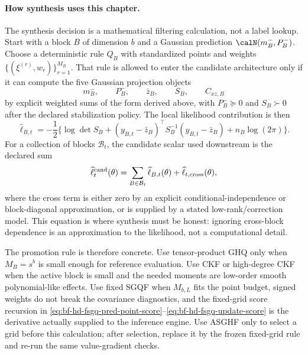 \paragraph{How synthesis uses this chapter.}
The synthesis decision is a mathematical filtering calculation, not a label
lookup.  Start with a block \(B\) of dimension \(b\) and a Gaussian prediction
\(\calN(m_B^-,P_B^-)\).  Choose a deterministic rule \(Q_B\) with standardized
points and weights \(\{(\xi^{(r)},w_r)\}_{r=1}^{M_B}\).  That rule is allowed
to enter the candidate architecture only if it can compute the five Gaussian
projection objects
\[
  m_B^-,\qquad
  P_B^-,\qquad
  \bar z_B,\qquad
  S_B,\qquad
  C_{xz,B}
\]
by explicit weighted sums of the form derived above, with \(P_B^-\succeq0\)
and \(S_B\succ0\) after the declared stabilization policy.  The local
likelihood contribution is then
\[
  \widehat\ell_{B,t}
  =
  -\frac12\{\log\det S_B
  +(y_{B,t}-\bar z_B)^\top S_B^{-1}(y_{B,t}-\bar z_B)
  +n_B\log(2\pi)\}.
\]
For a collection of blocks \(\mathcal B_t\), the candidate scalar used
downstream is the declared sum
\[
  \widehat\ell_t^{\rm cand}(\theta)
  =
  \sum_{B\in\mathcal B_t}\widehat\ell_{B,t}(\theta)
  +\widehat\ell_{t,\rm cross}(\theta),
\]
where the cross term is either zero by an explicit conditional-independence or
block-diagonal approximation, or is supplied by a stated low-rank/correction
model.  This equation is where synthesis must be honest: ignoring cross-block
dependence is an approximation to the likelihood, not a computational detail.

The promotion rule is therefore concrete.  Use tensor-product GHQ only when
\(M_B=s^b\) is small enough for reference evaluation.  Use CKF or high-degree
CKF when the active block is small and the needed moments are low-order smooth
polynomial-like effects.  Use fixed SGQF when \(M_{b,L}\) fits the point
budget, signed weights do not break the covariance diagnostics, and the
fixed-grid score recursion in
\eqref{eq:bf-hd-fsgq-pred-point-score}--\eqref{eq:bf-hd-fsgq-update-score}
is the derivative actually supplied to the inference engine.  Use ASGHF only to
select a grid before this calculation; after selection, replace it by the
frozen fixed-grid rule and re-run the same value-gradient checks.

